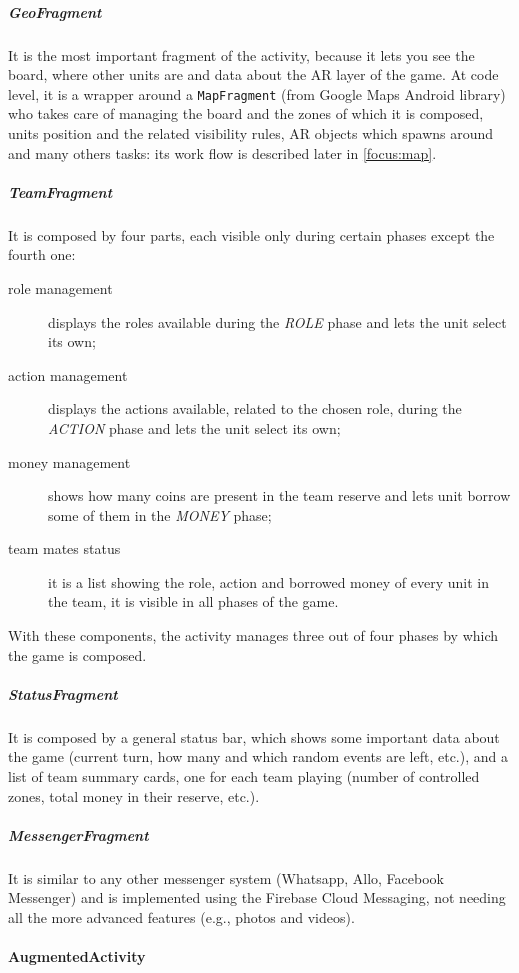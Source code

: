 			\subparagraph{GeoFragment}
			
			It is the most important fragment of the activity, because it lets you see the board, where other units are and data about the AR layer of the game.
			At code level, it is a wrapper around a \lstinline|MapFragment| (from Google Maps Android library) who takes care of managing the board and the zones of which it is composed, units position and the related visibility rules, AR objects which spawns around and many others tasks: its work flow is described later in \autoref{focus:map}.
			
			\subparagraph{TeamFragment}
			
			It is composed by four parts, each visible only during certain phases except the fourth one:
			\begin{description}
				\item[role management] displays the roles available during the \emph{ROLE} phase and lets the unit select its own;
				\item[action management] displays the actions available, related to the chosen role, during the \emph{ACTION} phase and lets the unit select its own;
				\item[money management] shows how many coins are present in the team reserve and lets unit borrow some of them in the \emph{MONEY} phase;
				\item[team mates status] it is a list showing the role, action and borrowed money of every unit in the team, it is visible in all phases of the game.
			\end{description}
			
			With these components, the activity manages three out of four phases by which the game is composed.
			
			\subparagraph{StatusFragment}
			
			It is composed by a general status bar, which shows some important data about the game (current turn, how many and which random events are left, etc.), and a list of team summary cards, one for each team playing (number of controlled zones, total money in their reserve, etc.).
			
			\subparagraph{MessengerFragment}
			
			It is similar to any other messenger system (Whatsapp, Allo, Facebook Messenger) and is implemented using the Firebase Cloud Messaging, not needing all the more advanced features (e.g., photos and videos).
		
		\paragraph{AugmentedActivity}
		
